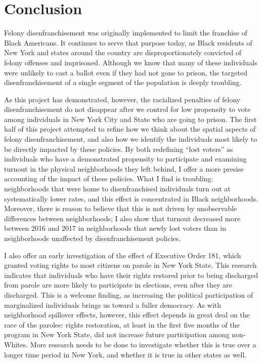 \documentclass[
  12pt,
]{article}
\begin{document}
\hypertarget{conclusion}{%
\section{Conclusion}\label{conclusion}}

Felony disenfranchisement was originally implemented to limit the franchise of Black Americans. It continues to serve that purpose today, as Black residents of New York and states around the country are disproportionately convicted of felony offenses and imprisoned. Although we know that many of these individuals were unlikely to cast a ballot even if they had not gone to prison, the targeted disenfranchisement of a single segment of the population is deeply troubling.

As this project has demonstrated, however, the racialized penalties of felony disenfranchisement do not disappear after we control for low propensity to vote among individuals in New York City and State who are going to prison. The first half of this project attempted to refine how we think about the spatial aspects of felony disenfranchisement, and also how we identify the individuals most likely to be directly impacted by these policies. By both redefining ``lost voters'' as individuals who have a demonstrated propensity to participate and examining turnout in the physical neighborhoods they left behind, I offer a more presise accounting of the impact of these policies. What I find is troubling: neighborhoods that were home to disenfranchised individuals turn out at systematically lower rates, and this effect is concentrated in Black neighborhoods. Moreover, there is reason to believe that this is not driven by unobservable differences between neighborhoods; I also show that turnout decreased more between 2016 and 2017 in neighborhoods that newly lost voters than in neighborhoods unaffected by disenfranchisement policies.

I also offer an early investigation of the effect of Executive Order 181, which granted voting rights to most citizens on parole in New York State. This research indicates that individuals who have their rights restored prior to being discharged from parole are more likely to participate in elections, even after they are discharged. This is a welcome finding, as increasing the political participation of marginalized individuals brings us toward a fuller democracy. As with neighborhood spillover effects, however, this effect depends in great deal on the race of the parolee: rights restoration, at least in the first five months of the program in New York State, did not increase future participation among non-Whites. More research needs to be done to investigate whether this is true over a longer time period in New York, and whether it is true in other states as well.
\end{document}
